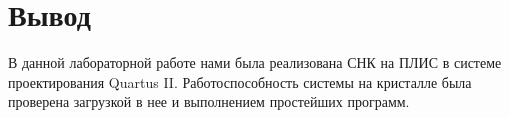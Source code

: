 \section*{Вывод}

В данной лабораторной работе нами была реализована СНК на ПЛИС в системе
проектирования Quartus II. Работоспособность системы на кристалле была
проверена загрузкой в нее и выполнением простейших программ.

